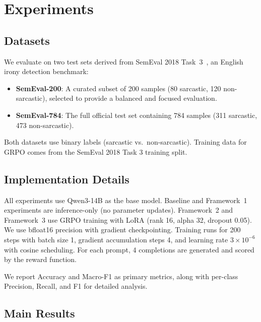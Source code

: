 \documentclass{article}
\begin{document}
\section{Experiments}

\subsection{Datasets}

We evaluate on two test sets derived from SemEval 2018 Task~3~\citep{semeval2018task3}, an English irony detection benchmark:

\begin{itemize}[leftmargin=*, itemsep=0pt]
    \item \textbf{SemEval-200}: A curated subset of 200 samples (80 sarcastic, 120 non-sarcastic), selected to provide a balanced and focused evaluation.
    \item \textbf{SemEval-784}: The full official test set containing 784 samples (311 sarcastic, 473 non-sarcastic).
\end{itemize}

Both datasets use binary labels (sarcastic vs.\ non-sarcastic). Training data for GRPO comes from the SemEval 2018 Task 3 training split.

\subsection{Implementation Details}

All experiments use Qwen3-14B as the base model. Baseline and Framework~1 experiments are inference-only (no parameter updates). Framework~2 and Framework~3 use GRPO training with LoRA (rank 16, alpha 32, dropout 0.05). We use bfloat16 precision with gradient checkpointing. Training runs for 200 steps with batch size 1, gradient accumulation steps 4, and learning rate $3 \times 10^{-6}$ with cosine scheduling. For each prompt, 4 completions are generated and scored by the reward function.

We report Accuracy and Macro-F1 as primary metrics, along with per-class Precision, Recall, and F1 for detailed analysis.

\subsection{Main Results}
\end{document}
